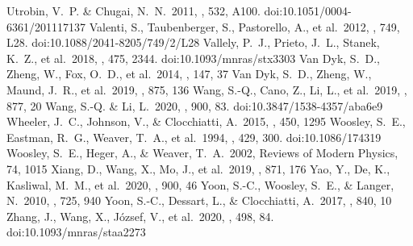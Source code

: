 \documentclass[twocolumn, linenumbers]{aastex62}
\begin{document}
\begin{thebibliography}{99}
 Utrobin, V.~P. \& Chugai, N.~N.\ 2011, \aap, 532, A100. doi:10.1051/0004-6361/201117137
 Valenti, S., Taubenberger, S., Pastorello, A., et al.\ 2012, \apjl, 749, L28. doi:10.1088/2041-8205/749/2/L28
 Vallely, P.~J., Prieto, J.~L., Stanek, K.~Z., et al.\ 2018, \mnras, 475, 2344. doi:10.1093/mnras/stx3303
 Van Dyk, S.~D., Zheng, W., Fox, O.~D., et al.\ 2014, \aj, 147, 37
 Van Dyk, S.~D., Zheng, W., Maund, J.~R., et al.\ 2019, \apj, 875, 136
 Wang, S.-Q., Cano, Z., Li, L., et al.\ 2019, \apj, 877, 20
 Wang, S.-Q. \& Li, L.\ 2020, \apj, 900, 83. doi:10.3847/1538-4357/aba6e9
 Wheeler, J.~C., Johnson, V., \& Clocchiatti, A.\ 2015, \mnras, 450, 1295
 Woosley, S.~E., Eastman, R.~G., Weaver, T.~A., et al.\ 1994, \apj, 429, 300. doi:10.1086/174319
 Woosley, S.~E., Heger, A., \& Weaver, T.~A.\ 2002, Reviews of Modern Physics, 74, 1015
 Xiang, D., Wang, X., Mo, J., et al.\ 2019, \apj, 871, 176
 Yao, Y., De, K., Kasliwal, M.~M., et al.\ 2020, \apj, 900, 46
 Yoon, S.-C., Woosley, S.~E., \& Langer, N.\ 2010, \apj, 725, 940
 Yoon, S.-C., Dessart, L., \& Clocchiatti, A.\ 2017, \apj, 840, 10
 Zhang, J., Wang, X., J{\'o}zsef, V., et al.\ 2020, \mnras, 498, 84. doi:10.1093/mnras/staa2273


\end{thebibliography}
\end{document}
